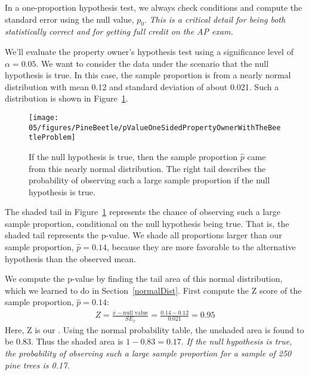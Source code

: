 \begin{termBox}{
In a one-proportion hypothesis test, we always check conditions and compute the standard error using the null value, $p_0$. \emph{This is a critical detail for being both statistically correct and for getting full credit on the AP exam.}}
\end{termBox}

We'll evaluate the property owner's hypothesis test using a significance level of $\alpha = 0.05$. We want to consider the data under the scenario that the null hypothesis is true. In this case, the sample proportion is from a nearly normal distribution with mean 0.12 and standard deviation of about 0.021. Such a distribution is shown in Figure~\ref{pValueOneSidedPropertyOwnerWithTheBeetleProblem}.

\begin{figure}[hht]
   \centering
   \texttt{[image: 05/figures/PineBeetle/pValueOneSidedPropertyOwnerWithTheBeetleProblem]}
   \caption{If the null hypothesis is true, then the sample proportion $\hat{p}$ came from this nearly normal distribution. The right tail describes the probability of observing such a large sample proportion if the null hypothesis is true.}
\label{pValueOneSidedPropertyOwnerWithTheBeetleProblem}
\end{figure}

The shaded tail in Figure~\ref{pValueOneSidedPropertyOwnerWithTheBeetleProblem} represents the chance of observing such a large sample proportion, conditional on the null hypothesis being true. That is, the shaded tail represents the p-value. We shade all proportions larger than our sample proportion, $\hat{p} = 0.14$, because they are more favorable to the alternative hypothesis than the observed mean.

We compute the p-value by finding the tail area of this normal distribution, which we learned to do in Section~\ref{normalDist}. First compute the Z score of the sample proportion, $\hat{p} = 0.14$:
\begin{eqnarray*}
Z = \frac{\bar{x} - \text{null value}}{SE_{\bar{x}}} = \frac{0.14 - 0.12}{0.021} = 0.95
\end{eqnarray*}
Here, Z is our . Using the normal probability table, the unshaded area is found to be 0.83. Thus the shaded area is $1 - 0.83 = 0.17$. \emph{If the null hypothesis is true, the probability of observing such a large sample proportion for a sample of 250 pine trees is 0.17.}

